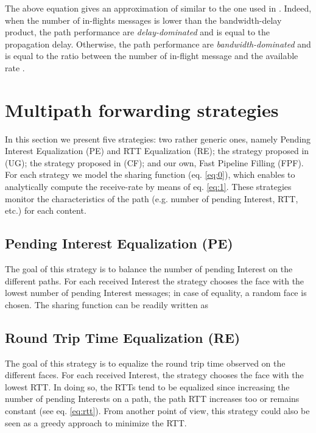 \documentclass{sig-alternate-10pt}
\begin{document}
The above equation gives an approximation of  similar to the one used in \cite{jacobson1988congestion}. Indeed, when the number of in-flights  messages is lower than the bandwidth-delay product, the path performance are \emph{delay-dominated} and  is equal to the propagation delay. Otherwise, the path performance are \emph{bandwidth-dominated} and  is equal to the ratio between the number of in-flight message and the available rate .

\section{Multipath forwarding strategies}
\label{s:ssb}
In this section we present five strategies: two rather generic ones, namely Pending Interest Equalization (PE) and RTT Equalization (RE); the strategy proposed in \cite{udugama} (UG); the strategy proposed in \cite{carofigliooptimal} (CF); and our own, Fast Pipeline Filling (FPF). For each strategy we model the sharing function  (eq. \ref{eq:0}), which enables to analytically compute the receive-rate  by means of eq. \ref{eq:1}. These strategies monitor the characteristics of the path (e.g. number of pending Interest, RTT, etc.) for each content. 

\subsection{Pending Interest Equalization (PE)}
The goal of this strategy is to balance the number of pending Interest on the different  paths. For each received Interest the strategy chooses the face with the lowest number of pending Interest messages; in case of equality, a random face is chosen. The sharing function  can be readily written as











\subsection{Round Trip Time Equalization (RE)}
The goal of this strategy is to equalize the round trip time observed on the different faces. For each received Interest, the strategy chooses the face with the lowest RTT. In doing so, the RTTs tend to be equalized since increasing the number of pending Interests on a path, the path RTT increases too or remains constant (see eq. \ref{eq:rtt}). From another point of view, this strategy could also be seen as a greedy approach to minimize the RTT. 
\end{document}
